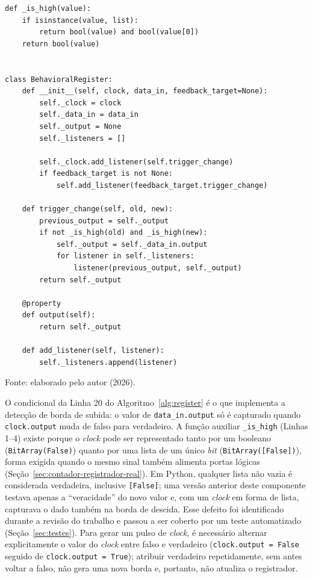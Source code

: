 \begin{algoritmo}[H]
\caption{Classe BehavioralRegister (components/behavioral\_register.py).}
\label{alg:register}
\begin{verbatim}
def _is_high(value):
    if isinstance(value, list):
        return bool(value) and bool(value[0])
    return bool(value)


class BehavioralRegister:
    def __init__(self, clock, data_in, feedback_target=None):
        self._clock = clock
        self._data_in = data_in
        self._output = None
        self._listeners = []

        self._clock.add_listener(self.trigger_change)
        if feedback_target is not None:
            self.add_listener(feedback_target.trigger_change)

    def trigger_change(self, old, new):
        previous_output = self._output
        if not _is_high(old) and _is_high(new):
            self._output = self._data_in.output
            for listener in self._listeners:
                listener(previous_output, self._output)
        return self._output

    @property
    def output(self):
        return self._output

    def add_listener(self, listener):
        self._listeners.append(listener)
\end{verbatim}
\begin{center}
\footnotesize Fonte: elaborado pelo autor (2026).
\end{center}
\end{algoritmo}

O condicional da Linha 20 do Algoritmo~\ref{alg:register} é o que implementa a detecção de borda de subida: o valor de \texttt{data\_in.output} só é capturado quando \texttt{clock.output} muda de falso para verdadeiro. A função auxiliar \texttt{\_is\_high} (Linhas 1--4) existe porque o \textit{clock} pode ser representado tanto por um booleano (\texttt{BitArray(False)}) quanto por uma lista de um único \textit{bit} (\texttt{BitArray([False])}), forma exigida quando o mesmo sinal também alimenta portas lógicas (Seção~\ref{sec:contador-registrador-real}). Em Python, qualquer lista não vazia é considerada verdadeira, inclusive \texttt{[False]}; uma versão anterior deste componente testava apenas a ``veracidade'' do novo valor e, com um \textit{clock} em forma de lista, capturava o dado também na borda de descida. Esse defeito foi identificado durante a revisão do trabalho e passou a ser coberto por um teste automatizado (Seção~\ref{sec:testes}). Para gerar um pulso de \textit{clock}, é necessário alternar explicitamente o valor do \textit{clock} entre falso e verdadeiro (\texttt{clock.output = False} seguido de \texttt{clock.output = True}); atribuir verdadeiro repetidamente, sem antes voltar a falso, não gera uma nova borda e, portanto, não atualiza o registrador.

